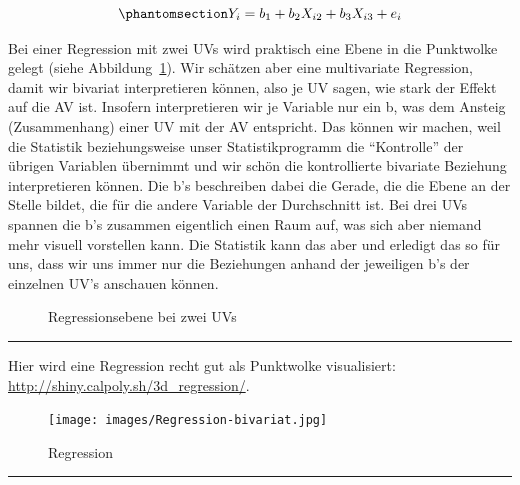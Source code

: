 \documentclass[
  10pt,
  letterpaper,
  a4paper, twoside]{scrreprt}
\begin{document}
\begin{equation}\phantomsection\label{eq-RegressionsKennwerte}{
 Y_i  = b_1 + b_2X_{i2} + b_3X_{i3}+e_i
}\end{equation}

Bei einer Regression mit zwei UVs wird praktisch eine Ebene in die
Punktwolke gelegt (siehe Abbildung~\ref{fig-Regressionsebene}). Wir
schätzen aber eine multivariate Regression, damit wir bivariat
interpretieren können, also je UV sagen, wie stark der Effekt auf die AV
ist. Insofern interpretieren wir je Variable nur ein b, was dem Ansteig
(Zusammenhang) einer UV mit der AV entspricht. Das können wir machen,
weil die Statistik beziehungsweise unser Statistikprogramm die
\enquote{Kontrolle} der übrigen Variablen übernimmt und wir schön die
kontrollierte bivariate Beziehung interpretieren können. Die b's
beschreiben dabei die Gerade, die die Ebene an der Stelle bildet, die
für die andere Variable der Durchschnitt ist. Bei drei UVs spannen die
b's zusammen eigentlich einen Raum auf, was sich aber niemand mehr
visuell vorstellen kann. Die Statistik kann das aber und erledigt das so
für uns, dass wir uns immer nur die Beziehungen anhand der jeweiligen
b's der einzelnen UV's anschauen können.

\begin{figure}


\caption{\label{fig-Regressionsebene}Regressionsebene bei zwei UVs}

\end{figure}%

\begin{center}\rule{0.5\linewidth}{0.5pt}\end{center}

Hier wird eine Regression recht gut als Punktwolke visualisiert:
\url{http://shiny.calpoly.sh/3d_regression/}.

\begin{figure}[H]

{\centering \texttt{[image: images/Regression-bivariat.jpg]}

}

\caption{Regression}

\end{figure}%

\begin{center}\rule{0.5\linewidth}{0.5pt}\end{center}
\end{document}
